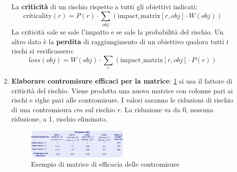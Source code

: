\begin{enumerate}
\begin{enumerate}
                    La \textbf{criticità} di un rischio rispetto a tutti gli
                    obiettivi indicati:
                    \begin{equation}
                        \text{criticality}(r) = P(r) \cdot \sum_{obj}
                        (\text{impact\_matrix}[r, obj] \cdot W(obj))
                    \end{equation}
                    La criticità sale se sale l'impatto e se sale la probabilità
                    del rischio. Un altro dato è la \textbf{perdita} di raggiungimento
                    di un obiettivo qualora tutti i rischi si verificassero:
                    \begin{equation}
                        loss(obj) = W(obj) \cdot \sum_{r}
                        (\text{impact\_matrix}[r, obj] \cdot P(r))
                    \end{equation}
              \item \textbf{Elaborare contromisure efficaci per la matrice}:
                    \ref{fig:eff-matrix} si usa il fattore di criticità del
                    rischio. Viene prodotta una nuova matrice con colonne pari
                    ai rischi e righe pari alle contromisure. I valori saranno
                    le riduzioni di rischio di una contromisura $cm$ sul rischio
                    $r$. La riduzione va da 0, nessuna riduzione, a 1, rischio
                    eliminato.
                    \begin{figure}[!ht]
                        \centering
                        \includegraphics[width=0.5\textwidth]{img/risk/Effectiveness Matrix.png}
                        \caption{Esempio di matrice di efficacia delle contromisure}
                        \label{fig:eff-matrix}
                    \end{figure}


\end{enumerate}
\end{enumerate}
